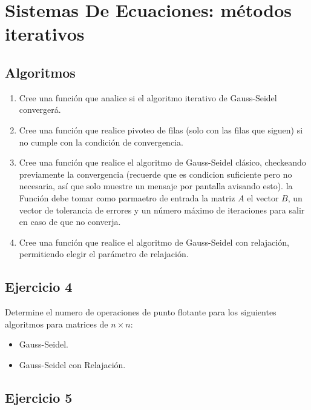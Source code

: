 \documentclass[a4paper,11pt]{article}
\theoremstyle{mytheor}
\begin{document}
\section*{Sistemas De Ecuaciones: métodos iterativos}

\subsection*{Algoritmos}

\begin{enumerate}[label=\Roman*]

\item Cree una función que analice si el algoritmo iterativo de Gauss-Seidel convergerá.

\item Cree una función que realice pivoteo de filas (solo con las filas que siguen) si no cumple con la condición de convergencia.

\item Cree una función que realice el algoritmo de Gauss-Seidel clásico, checkeando previamente la convergencia (recuerde que es condicion suficiente pero no necesaria, así que solo muestre un mensaje por pantalla avisando esto). la Función debe tomar como parmaetro de entrada la matriz $A$ el vector $B$, un vector de tolerancia de errores y un número máximo de iteraciones para salir en caso de que no converja. 

\item Cree una función que realice el algoritmo de Gauss-Seidel con relajación, permitiendo elegir el parámetro de relajación.
 
\end{enumerate}


\subsection*{Ejercicio 4}

Determine el numero de operaciones de punto flotante para los siguientes algoritmos para matrices de $n\times	n$:
\begin{itemize}
\item Gauss-Seidel.
\item Gauss-Seidel con Relajación.
\end{itemize}

\subsection*{Ejercicio 5}
\end{document}
